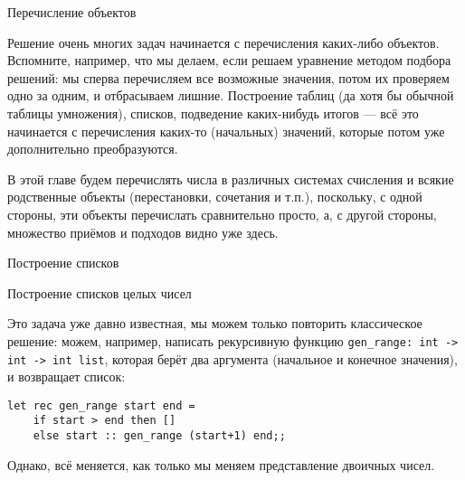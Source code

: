 Перечисление объектов

Решение очень многих задач начинается с перечисления каких-либо объектов.
Вспомните, например, что мы делаем, если решаем уравнение методом подбора 
решений: мы сперва перечисляем все возможные значения, потом их проверяем 
одно за одним, и отбрасываем лишние. Построение таблиц (да хотя бы обычной
таблицы умножения), списков, подведение каких-нибудь итогов --- всё это 
начинается с перечисления каких-то (начальных) значений, которые потом уже
дополнительно преобразуются. 

В этой главе будем перечислять числа в различных системах счисления и всякие 
родственные объекты (перестановки, сочетания и т.п.), поскольку,
с одной стороны, эти объекты перечислать сравнительно просто, а, с другой
стороны, множество приёмов и подходов видно уже здесь.

Построение списков 

Построение списков целых чисел

Это задача уже давно известная, мы можем только повторить классическое решение:
можем, например, написать рекурсивную функцию \verb!gen_range: int -> int -> int list!,
которая берёт два аргумента (начальное и конечное значения), и возвращает
список:

\begin{verbatim}
let rec gen_range start end =
    if start > end then []
    else start :: gen_range (start+1) end;;
\end{verbatim}

Однако, всё меняется, как только мы меняем представление двоичных чисел.